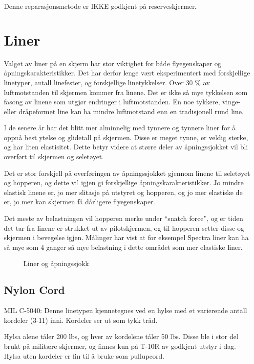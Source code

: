 Denne reparasjonsmetode er IKKE godkjent på reserveskjermer.

\section{Liner}
Valget av liner på en skjerm har stor viktighet for både flyegenskaper og åpningskarakteristikker. Det har derfor lenge vært eksperimentert med forskjellige linetyper, antall linefester, og forskjellige linetykkelser. Over 30 \% av luftmotstanden til skjermen kommer fra linene. Det er ikke så mye tykkelsen som fasong av linene som utgjør endringer i luftmotstanden. En noe tykkere, vinge- eller dråpeformet line kan ha mindre luftmotstand enn en tradisjonell rund line.

I de senere år har det blitt mer alminnelig med tynnere og tynnere liner for å oppnå best ytelse og glidetall på skjermen. Disse er meget tynne, er veldig sterke, og har liten elastisitet. Dette betyr videre at større deler av åpningssjokket vil bli overført til skjermen og seletøyet.

Det er stor forskjell på overføringen av åpningssjokket gjennom linene til seletøyet og hopperen, og dette vil igjen gi forskjellige åpningskarakteristikker. Jo mindre elastisk linene er, jo mer slitasje på utstyret og hopperen, og jo mer elastiske de er, jo mer kan skjermen få dårligere flyegenskaper.

Det meste av belastningen vil hopperen merke under ``snatch force'', og er tiden det tar fra linene er strukket ut av pilotskjermen, og til hopperen setter disse og skjermen i bevegelse igjen. Målinger har vist at for eksempel Spectra liner kan ha så mye som 4 ganger så mye belastning i dette området som mer elastiske liner.

\begin{figure}
	\caption{Liner og åpningssjokk}
\end{figure}

\subsection{Nylon Cord}
MIL C-5040: Denne linetypen kjennetegnes ved en hylse med et varierende antall kordeler (3-11) inni. Kordeler ser ut som tykk tråd.

Hylsa alene tåler 200 lbs, og hver av kordelene tåler 50 lbs. Disse ble i stor del brukt på militære skjermer, og finnes kun på T-10R av godkjent utstyr i dag. Hylsa uten kordeler er fin til å bruke som pullupcord.

